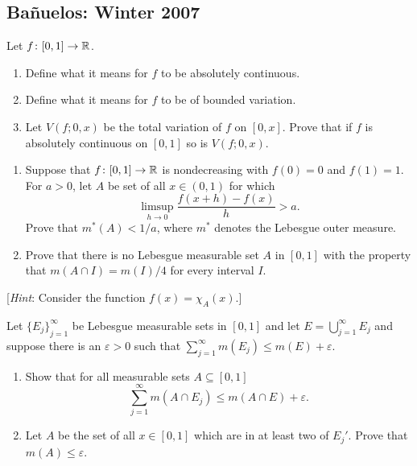 \subsection{Bañuelos: Winter 2007}
\setcounter{exercise}{0}
\setcounter{equation}{0}
\begin{problem}
  Let $f\colon[0,1]\to\mathbb{R}$.
  \begin{enumerate}[label=(\roman*),noitemsep]
  \item Define what it means for $f$ to be absolutely continuous.
  \item Define what it means for $f$ to be of bounded variation.
  \item Let $V(f;0,x)$ be the total variation of $f$ on $[0,x]$. Prove that
    if $f$ is absolutely continuous on $[0,1]$ so is $V(f;0,x)$.
  \end{enumerate}
\end{problem}
\begin{solution}
\end{solution}

\begin{problem}
  \hfill
  \begin{enumerate}[label=(\roman*),noitemsep]
  \item Suppose that $f\colon[0,1]\to\mathbb{R}$ is nondecreasing with $f(0)=0$
    and $f(1)=1$. For $a>0$, let $A$ be set of all $x\in(0,1)$ for which
    \[
      \limsup_{h\to 0}\frac{f(x+h)-f(x)}{h}>a.
    \]
    Prove that $m^*(A)<1/a$, where $m^*$ denotes the Lebesgue outer
    measure.
  \item Prove that there is no Lebesgue measurable set $A$ in $[0,1]$ with
    the property that $m(A\cap I)=m(I)/4$ for every interval $I$.
  \end{enumerate}
  [\emph{Hint}: Consider the function $f(x)=\chi_A(x)$.]
\end{problem}
\begin{solution}
\end{solution}

\begin{problem}
  Let ${\{E_j\}}_{j=1}^\infty$ be Lebesgue measurable sets in $[0,1]$ and
  let $E=\bigcup_{j=1}^\infty E_j$ and suppose there is an $\varepsilon>0$
  such that $\sum_{j=1}^\infty m(E_j)\leq m(E)+\varepsilon$.
  \begin{enumerate}[label=(\roman*),noitemsep]
  \item Show that for all measurable sets $A\subseteq[0,1]$
    \[
      \sum_{j=1}^\infty m(A\cap E_j)\leq m(A\cap E)+\varepsilon.
    \]
  \item Let $A$ be the set of all $x\in[0,1]$ which are in at least two of
    $E_j'$. Prove that $m(A)\leq\varepsilon$.
  \end{enumerate}
\end{problem}
\begin{solution}
\end{solution}

